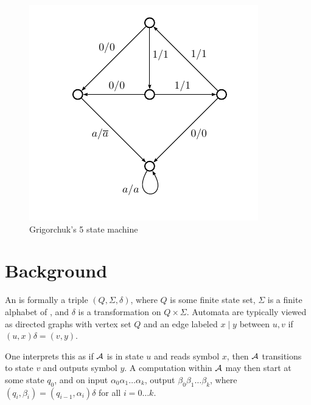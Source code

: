 \documentclass[11pt, titlepage]{article}
\begin{document}
\begin{figure}
\begin{center}
\includegraphics[scale=0.5]{figures/grigorchuk}
\end{center}
\caption{Grigorchuk's 5 state machine}
\end{figure}

\section{Background}
An  is formally a triple $(Q, \Sigma, \delta)$, where
$Q$ is some finite state set, $\Sigma$ is a finite alphabet of
, and $\delta$ is a transformation on $Q \times \Sigma$.
Automata are typically viewed as directed graphs with vertex set $Q$
and an edge labeled $x \mid y$ between $u, v$ if
$(u, x)\delta = (v, y)$.

\begin{center}
\end{center}

One interprets this as if $\mathcal{A}$ is in state $u$ and reads symbol $x$,
then $\mathcal{A}$ transitions to state $v$ and outputs symbol $y$. A
computation within $\mathcal{A}$ may then start at some state $q_0$, and on
input $\alpha_0 \alpha_1 \ldots \alpha_k$, output
$\beta_0 \beta_1 \ldots \beta_k$, where
$(q_i, \beta_i) = (q_{i-1}, \alpha_i)\delta$ for all $i = 0\ldots k$.
\end{document}
